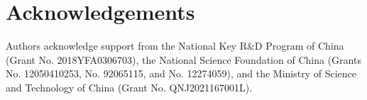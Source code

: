 \documentclass[aps, pra, reprint, superscriptaddress]{revtex4-1}
\begin{document}
\section*{Acknowledgements}
Authors acknowledge support from the National Key R\&D Program of China (Grant No. 2018YFA0306703), the National Science Foundation of
China (Grants No. 12050410253, No. 92065115, and No. 12274059), and the Ministry of Science and Technology of China (Grant No. QNJ2021167001L). 




 
\end{document}
